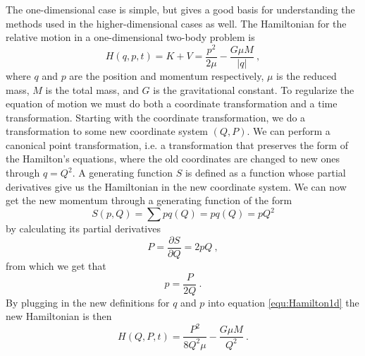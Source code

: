\documentclass[english, oneside]{HYgradu}
\begin{document}
The one-dimensional case is simple, but gives a good basis for understanding the methods used in the higher-dimensional cases as well. The Hamiltonian for the relative motion in a one-dimensional two-body problem is
\begin{equation} \label{equ:Hamilton1d}
H(q,p,t) = K + V = \frac{p^2}{2 \mu} - \frac{G \mu M}{\left| q \right|} \ ,
\end{equation}
where $q$ and $p$ are the position and momentum respectively, $\mu$ is the reduced mass, $M$ is the total mass, and $G$ is the gravitational constant. 
To regularize the equation of motion we must do both a coordinate transformation and a time transformation. Starting with the coordinate transformation, we do a transformation to some new coordinate system $(Q, P)$. We can perform a canonical point transformation, i.e. a transformation that preserves the form of the Hamilton's equations, where the old coordinates are changed to new ones through $q = Q^2$. A generating function $S$ is defined as a function whose partial derivatives give us the Hamiltonian in the new coordinate system. We can now get the new momentum through a generating function of the form
\begin{equation}
S(p,Q) = \sum p q(Q) = pq(Q) = pQ^2
\end{equation}
by calculating its partial derivatives
\begin{equation}
P = \frac{\partial S}{\partial Q} = 2pQ \ ,
\end{equation}
from which we get that
\begin{equation}
p = \frac{P}{2Q} \ .
\end{equation}
By plugging in the new definitions for $q$ and $p$ into equation \ref{equ:Hamilton1d} the new Hamiltonian is then
\begin{equation}
H(Q,P,t) = \frac{P^2}{8Q^2 \mu} - \frac{G \mu M}{Q^2} \ .
\end{equation}
\end{document}
